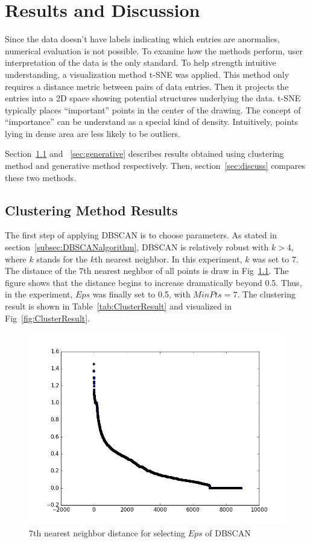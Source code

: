 \chapter{Results and Discussion}
\label{chapter:results}
Since the data doesn't have labels indicating which entries are anormalies, numerical evaluation is not possible. To examine how the methods perform, user interpretation of the data is the only standard. To help strength intuitive understanding, a visualization method t-SNE\cite{maaten2008visualizing} was applied. This method only requires a distance metric between pairs of data entries. Then it projects the entries into a 2D space showing potential structures underlying the data. t-SNE typically places ``important'' points in the center of the drawing. The concept of ``importance'' can be understand as a special kind of density. Intuitively, points lying in dense area are less likely to be outliers.

Section~\ref{sec:clustering} and ~\ref{sec:generative} describes results obtained using clustering method and generative method respectively. Then, section~\ref{sec:discuss} compares these two methods.
\section{Clustering Method Results}
\label{sec:clustering}
The first step of applying DBSCAN is to choose parameters. As stated in section~\ref{subsec:DBSCANalgorithm}, DBSCAN is relatively robust with $k > 4$, where $k$ stands for the $k$th nearest neighbor. In this experiment, $k$ was set to 7. The distance of the $7$th nearest neghbor of all points is draw in Fig~\ref{fig:paramDBSCAN}. The figure shows that the distance begins to increase dramatically beyond 0.5. Thus, in the experiment, $Eps$ was finally set to 0.5, with $MinPts = 7$. The clustering result is shown in Table~\ref{tab:ClusterResult} and visualized in Fig~\ref{fig:ClusterResult}.
\begin{figure}[!ht]
	\begin{center}
		\includegraphics[width=\textwidth]{images/paramDBSCAN}
		\caption{7th nearest neighbor distance for selecting $Eps$ of DBSCAN}
		\label{fig:paramDBSCAN}
	\end{center}
\end{figure}

